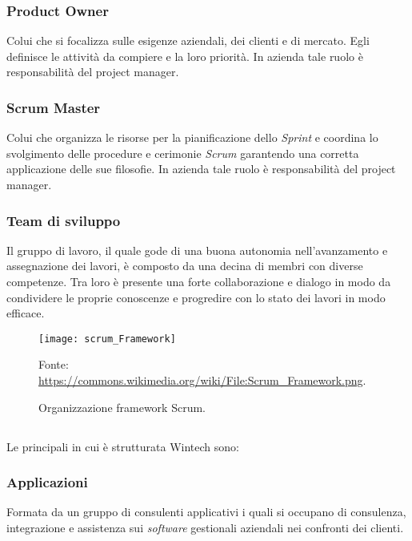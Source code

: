 \subsubsection*{Product Owner}
Colui che si focalizza sulle esigenze aziendali, dei clienti e di mercato. Egli definisce le attività da compiere e la loro priorità.
In azienda tale ruolo è responsabilità del \gls{project manager}. 

\subsubsection*{Scrum Master}
Colui che organizza le risorse per la pianificazione dello \emph{Sprint} e coordina lo svolgimento delle procedure e cerimonie \emph{Scrum} garantendo una corretta applicazione delle sue filosofie.
In azienda tale ruolo è responsabilità del \gls{project manager}. 

\subsubsection*{Team di sviluppo}
Il gruppo di lavoro, il quale gode di una buona autonomia nell'avanzamento e assegnazione dei lavori, è composto da una decina di membri con diverse competenze. Tra loro è presente una forte collaborazione e dialogo in modo da condividere le proprie conoscenze e progredire con lo stato dei lavori in modo efficace. 

\begin{figure}[htbp] 
    \centering 
    \texttt{[image: scrum\_Framework]} 
    \caption{Organizzazione framework Scrum.}
    \label{fig:scrum_framework}
    \vspace{1mm}
    Fonte: \url{https://commons.wikimedia.org/wiki/File:Scrum_Framework.png}.
\end{figure}



\subsection{}
Le principali  in cui è strutturata Wintech sono:

\subsubsection*{Applicazioni}
Formata da un gruppo di consulenti applicativi i quali si occupano di consulenza, integrazione e assistenza sui \emph{software} gestionali aziendali nei confronti dei clienti. 

